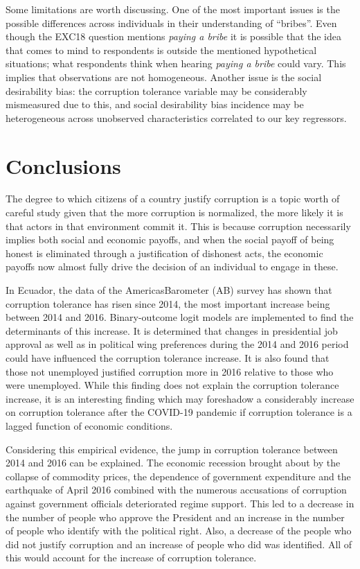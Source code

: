 \documentclass[12pt,a4]{article}\usepackage[]{graphicx}\usepackage[]{xcolor}
\begin{document}
Some limitations are worth discussing. One of the most important issues is the possible differences across individuals in their understanding of \enquote{bribes}. Even though the EXC18 question mentions \textit{paying a bribe} it is possible that the idea that comes to mind to respondents is outside the mentioned hypothetical situations; what respondents think when hearing \textit{paying a bribe} could vary. This implies that observations are not homogeneous. Another issue is the social desirability bias: the corruption tolerance variable may be considerably mismeasured due to this, and social desirability bias incidence may be heterogeneous across unobserved characteristics correlated to our key regressors.







\section{Conclusions}

The degree to which citizens of a country justify corruption is a topic worth of careful study given that the more corruption is normalized, the more likely it is that actors in that environment commit it. This is because corruption necessarily implies both social and economic payoffs, and when the social payoff of being honest is eliminated through a justification of dishonest acts, the economic payoffs now almost fully drive the decision of an individual to engage in these. 

In Ecuador, the data of the AmericasBarometer (AB) survey has shown that corruption tolerance has risen since 2014, the most important increase being between 2014 and 2016. Binary-outcome logit models are implemented to find the determinants of this increase. It is determined that changes in presidential job approval as well as in political wing preferences during the 2014 and 2016 period could have influenced the corruption tolerance increase. It is also found that those not unemployed justified corruption more in 2016 relative to those who were unemployed. While this finding does not explain the corruption tolerance increase, it is an interesting finding which may foreshadow a considerably increase on corruption tolerance after the COVID-19 pandemic if corruption tolerance is a lagged function of economic conditions. 

Considering this empirical evidence, the jump in corruption tolerance between 2014 and 2016 can be explained. The economic recession brought about by the collapse of commodity prices, the dependence of government expenditure and the earthquake of April 2016 combined with the numerous accusations of corruption against government officials deteriorated regime support. This led to a decrease in the number of people who approve the President and an increase in the number of people who identify with the political right.  Also, a decrease of the people who did not justify corruption and an increase of people who did was identified. All of this would account for the increase of corruption tolerance.
\end{document}
